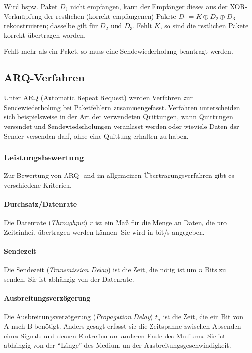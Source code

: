 \documentclass[a4paper, 14pt]{article}
\begin{document}
	Wird bspw. Paket $D_1$ nicht empfangen, kann der Empfänger dieses aus der XOR-Verknüpfung der restlichen (korrekt empfangenen) Pakete $D_1 = K \oplus D_2 \oplus D_3$ rekonstruieren; dasselbe gilt für $D_2$ und $D_3$.
	Fehlt $K$, so sind die restlichen Pakete korrekt übertragen worden.

	Fehlt mehr als ein Paket, so muss eine Sendewiederholung beantragt werden.

	\subsection{ARQ-Verfahren}

	Unter ARQ (Automatic Repeat Request) werden Verfahren zur Sendewiederholung bei Paketfehlern zusammengefasst.
	Verfahren unterscheiden sich beispielsweise in der Art der verwendeten Quittungen, wann Quittungen versendet und Sendewiederholungen veranlasst werden oder wieviele Daten der Sender versenden darf, ohne eine Quittung erhalten zu haben.

	\subsubsection{Leistungsbewertung}

	Zur Bewertung von ARQ- und im allgemeinen Übertragungsverfahren gibt es verschiedene Kriterien.

	\paragraph{Durchsatz/Datenrate}

	Die Datenrate (\emph{Throughput}) $r$ ist ein Maß für die Menge an Daten, die pro Zeiteinheit übertragen werden können.
	Sie wird in bit/s angegeben.

	\paragraph{Sendezeit}

	Die Sendezeit (\emph{Transmission Delay}) ist die Zeit, die nötig ist um $n$ Bits zu senden.
	Sie ist abhängig von der Datenrate.

	\paragraph{Ausbreitungsverzögerung}

	Die Ausbreitungsverzögerung (\emph{Propagation Delay}) $t_a$ ist die Zeit, die ein Bit von A nach B benötigt.
	Anders gesagt erfasst sie die Zeitspanne zwischen Absenden eines Signals und dessen Eintreffen am anderen Ende des Mediums.
	Sie ist abhängig von der \enquote{Länge} des Medium un der Ausbreitungsgeschwindigkeit.
\end{document}
